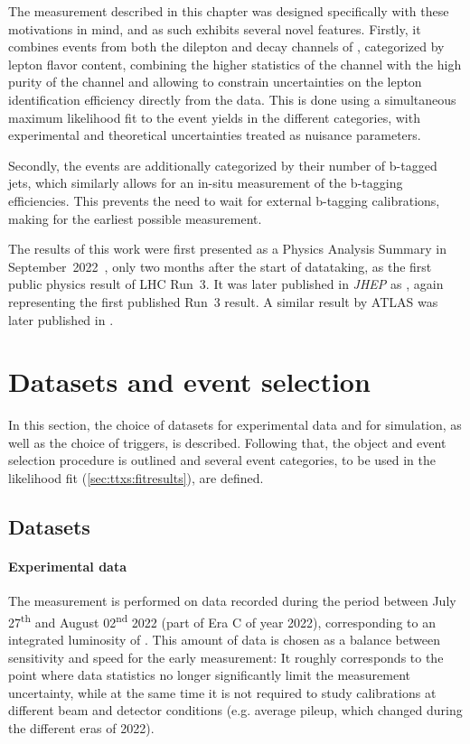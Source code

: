 The measurement described in this chapter was designed specifically with these motivations in mind, and as such exhibits several novel features. Firstly, it combines events from both the dilepton and \ljets decay channels of \ttbar, categorized by lepton flavor content, combining the higher statistics of the \ljets channel with the high purity of the \emu channel and allowing to constrain uncertainties on the lepton identification efficiency directly from the data. This is done using a simultaneous maximum likelihood fit to the event yields in the different categories, with experimental and theoretical uncertainties treated as nuisance parameters.

Secondly, the events are additionally categorized by their number of b-tagged jets, which similarly allows for an in-situ measurement of the b-tagging efficiencies. This prevents the need to wait for external b-tagging calibrations, making for the earliest possible measurement.

The results of this work were first presented as a Physics Analysis Summary in September~2022~\cite{CMS:TOP-22-012-PAS}, only two months after the start of datataking, as the first public physics result of LHC Run~3. It was later published in \textit{JHEP} as , again representing the first published Run~3 result. A similar result by ATLAS was later published in .

\section{Datasets and event selection}

In this section, the choice of datasets for experimental data and for simulation, as well as the choice of triggers, is described. Following that, the object and event selection procedure is outlined and several event categories, to be used in the likelihood fit (\cref{sec:ttxs:fitresults}), are defined. 

\subsection{Datasets}
\label{sec:ttxs:datasets}

\paragraph{Experimental data}
The measurement is performed on data recorded during the period between July 27\textsuperscript{th} and August 02\textsuperscript{nd} 2022 (part of Era C of year 2022), corresponding to an integrated luminosity of \lumiRIII. This amount of data is chosen as a balance between sensitivity and speed for the early measurement: It roughly corresponds to the point where data statistics no longer significantly limit the measurement uncertainty, while at the same time it is not required to study calibrations at different beam and detector conditions (e.g. average pileup, which changed during the different eras of 2022).

